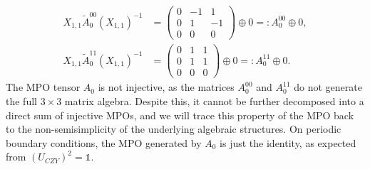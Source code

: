 \documentclass[prx, twocolumn, superscriptaddress, dvipsnames]{revtex4-2}
\theoremstyle{definition}
\begin{document}
\begin{align}
    X_{1,1} \tilde{A}_0^{00} (X_{1,1})^{-1} &= 
    \begin{pmatrix}
        0 & -1 & 1 \\
        0 & 1 & -1 \\
        0 & 0 & 0
    \end{pmatrix} 
    \oplus 0 =: A_0^{00} \oplus 0, \nonumber \\
    X_{1,1} \tilde{A}_0^{11} (X_{1,1})^{-1} &= 
    \begin{pmatrix}
        0 & 1 & 1 \\
        0 & 1 & 1 \\
        0 & 0 & 0
    \end{pmatrix}
    \oplus 0 =: A_0^{11} \oplus 0.
\end{align}
The MPO tensor $A_0$ is not injective, as the matrices $A_0^{00}$ and $A_0^{11}$ do not generate the full $3 \times 3$ matrix algebra. Despite this, it cannot be further decomposed into a direct sum of injective MPOs, and we will trace this property of the MPO back to the non-semisimplicity of the underlying algebraic structures. On periodic boundary conditions, the MPO generated by $A_0$ is just the identity, as expected from $(U_{CZY})^2 = \mathbb 1$.
\end{document}
